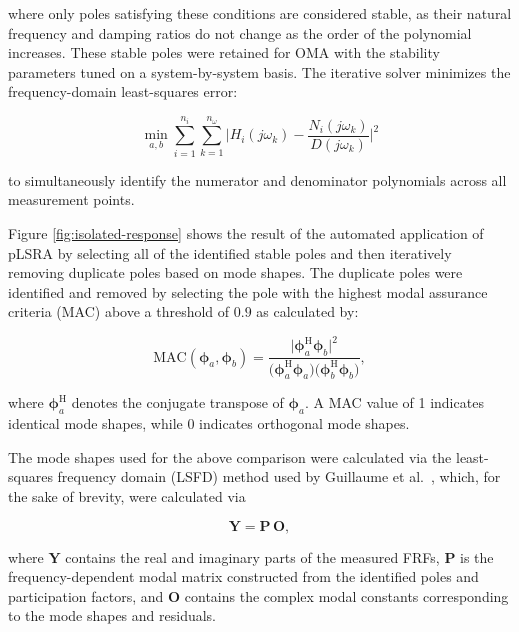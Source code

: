 \documentclass[colorlinks,upint,subscriptcorrection,varvw,hyphenate,balance,govt]{asmeconf}
\begin{document}
\noindent
where only poles satisfying these conditions are considered stable, as their natural frequency and damping ratios do not change as the order of the polynomial increases. These stable poles were retained for OMA with the stability parameters tuned on a system-by-system basis. The iterative solver minimizes the frequency-domain least-squares error:

\begin{equation}\label{eq:lsq_error}
    \min_{a,b} \sum_{i=1}^{n_i} \sum_{k=1}^{n_\omega} \Big| H_i(j\omega_k) - \frac{N_i(j\omega_k)}{D(j\omega_k)} \Big|^2
\end{equation}

\noindent
to simultaneously identify the numerator and denominator polynomials across all measurement points.

Figure \ref{fig:isolated-response} shows the result of the automated application of pLSRA by selecting all of the identified stable poles and then iteratively removing duplicate poles based on mode shapes. The duplicate poles were identified and removed by selecting the pole with the highest modal assurance criteria (MAC) above a threshold of $0.9$ as calculated by:

\begin{equation}\label{eq:mac}
    \text{MAC}(\boldsymbol{\phi}_a, \boldsymbol{\phi}_b) = \frac{ \big| \boldsymbol{\phi}_a^\mathrm{H} \boldsymbol{\phi}_b \big|^2 }{ \big( \boldsymbol{\phi}_a^\mathrm{H} \boldsymbol{\phi}_a \big) \big( \boldsymbol{\phi}_b^\mathrm{H} \boldsymbol{\phi}_b \big) },
\end{equation}

\noindent
where $\boldsymbol{\phi}_a^\mathrm{H}$ denotes the conjugate transpose of $\boldsymbol{\phi}_a$. A MAC value of 1 indicates identical mode shapes, while 0 indicates orthogonal mode shapes.

The mode shapes used for the above comparison were calculated via the least-squares frequency domain (LSFD) method used by Guillaume et al.\ \cite{Guillaume2003}, which, for the sake of brevity, were calculated via

\begin{equation}\label{eq:lsfd}
    \mathbf{Y} = \mathbf{P} \, \mathbf{O},
\end{equation}

\noindent
where $\mathbf{Y}$ contains the real and imaginary parts of the measured FRFs, $\mathbf{P}$ is the frequency-dependent modal matrix constructed from the identified poles and participation factors, and $\mathbf{O}$ contains the complex modal constants corresponding to the mode shapes and residuals.
\end{document}
